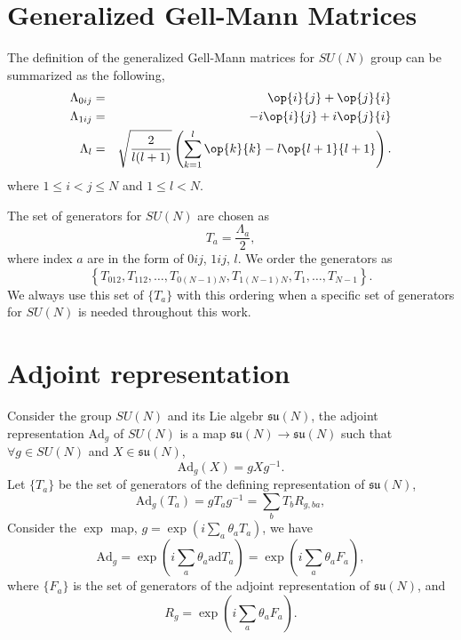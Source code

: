 \documentclass{article}
\begin{document}
\appendix
\section{Generalized Gell-Mann Matrices}
\label{appendix:ggm}
The definition of the generalized Gell-Mann matrices\cite{Bertlmann_2008}
for $SU(N)$ group can be summarized as the following,
\begin{eqnarray}
  \Lambda_{0ij} & = & \op{i}{j}+\op{j}{i} \\
  \Lambda_{1ij} & = & -i\op{i}{j}+i\op{j}{i} \\
  \Lambda_{l}   & = & \sqrt{\frac{2}{l(l+1)}}\left(
    \sum_{k=1}^l\op{k}{k}-l\op{l+1}{l+1}\right).
\end{eqnarray}
where $1 \le i < j \le N$ and $1 \le l < N$.

The set of generators for $SU(N)$ are chosen as
\begin{equation}
  \label{eq:t_a}
  T_a = \frac{\Lambda_a}{2},
\end{equation}
where index $a$ are in the form of $0ij$, $1ij$, $l$.  We order
the generators as
\begin{equation}
  \label{eq:t_a_ordering}
  \left\{T_{012}, T_{112}, \ldots, T_{0(N-1)N}, T_{1(N-1)N}, T_1,\ldots,
  T_{N-1}\right\}.
\end{equation}
We always use this set of $\{T_a\}$ with this ordering when a specific
set of generators for $SU(N)$ is needed throughout this work.


\section{Adjoint representation}
\label{appendix:adj_rep}
Consider the group $SU(N)$ and its Lie algebr $\mathfrak{su}(N)$, the adjoint
representation\cite{hall2000elementaryintroductiongroupsrepresentations}
$\text{Ad}_g$ of $SU(N)$ is a map
$\mathfrak{su}(N)\rightarrow\mathfrak{su}(N)$ such that $\forall g\in SU(N)$
and $X \in \mathfrak{su}(N)$,
\begin{equation}
  \text{Ad}_g(X) = gXg^{-1}.
\end{equation}
Let $\{T_a\}$ be the set of generators of the defining representation of
$\mathfrak{su}(N)$,
\begin{equation}
  \label{eq:R_g}
  \text{Ad}_g(T_a) = gT_ag^{-1} = \sum_b T_b R_{g,ba},
\end{equation}
Consider the $\exp$ map, $g = \exp\left(i\sum_a\theta_a T_a\right)$, we have
\begin{equation}
  \text{Ad}_g = \exp\left(i\sum_a\theta_a\text{ad}T_a\right)
  = \exp\left(i\sum_a\theta_aF_a\right),
\end{equation}
where $\{F_a\}$ is the set of generators of the adjoint representation
of $\mathfrak{su}(N)$, and
\begin{equation}
  R_g = \exp\left(i\sum_a\theta_aF_a\right).
\end{equation}
\end{document}
